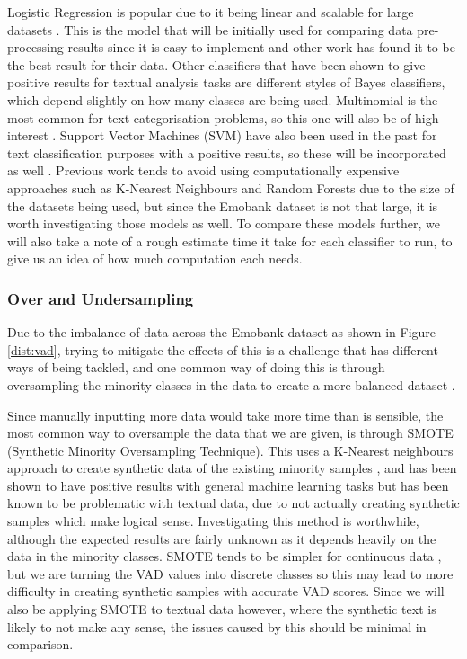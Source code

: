 Logistic Regression is popular due to it being linear and scalable for large datasets \cite{towardsDS}. This is the model that will be initially used for comparing data pre-processing results since it is easy to implement and other work has found it to be the best result for their data. 
Other classifiers that have been shown to give positive results for textual analysis tasks are different styles of Bayes classifiers,  which depend slightly on how many classes are being used. Multinomial is the most common for text categorisation problems, so this one will also be of high interest \cite{frank2006naive}. Support Vector Machines (SVM) have also been used in the past for text classification purposes with a positive results, so these will be incorporated as well \cite{joachims1998text}. Previous work tends to avoid using computationally expensive approaches such as K-Nearest Neighbours and Random Forests due to the size of the datasets being used, but since the Emobank dataset is not that large, it is worth investigating those models as well. To compare these models further, we will also take a note of a rough estimate time it take for each classifier to run, to give us an idea of how much computation each needs.

\subsubsection{Over and Undersampling}

Due to the imbalance of data across the Emobank dataset as shown in Figure \ref{dist:vad}, trying to mitigate the effects of this is a challenge that has different ways of being tackled, and one common way of doing this is through oversampling the minority classes in the data to create a more balanced dataset \cite{towardsDS}.

Since manually inputting more data would take more time than is sensible, the most common way to oversample the data that we are given, is through SMOTE (Synthetic Minority Oversampling Technique). This uses a K-Nearest neighbours approach to create synthetic data of the existing minority samples , and has been shown to have positive results with general machine learning tasks but has been known to be problematic with textual data, due to not actually creating synthetic samples which make logical sense. Investigating this method is worthwhile, although the expected results are fairly unknown as it depends heavily on the data in the minority classes. SMOTE tends to be simpler for continuous data \cite{chawla2002smote}, but we are turning the VAD values into discrete classes so this may lead to more difficulty in creating synthetic samples with accurate VAD scores. Since we will also be applying SMOTE to textual data however, where the synthetic text is likely to not make any sense, the issues caused by this should be minimal in comparison. 

